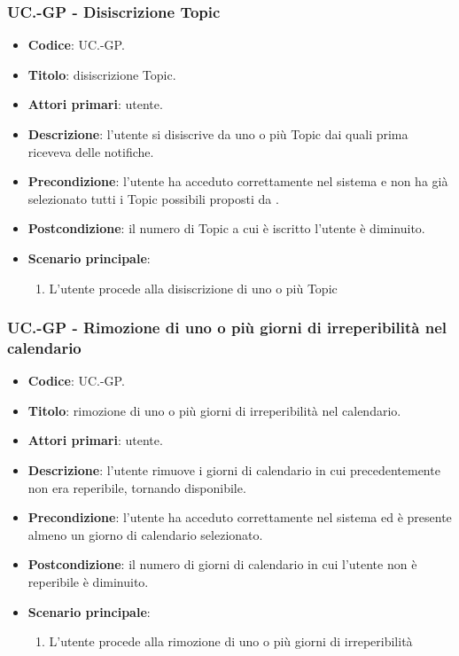 	\subsubsection{UC\theuccount.\thesubuccount-GP - Disiscrizione Topic}

		\begin{itemize}
			\item \textbf{Codice}: UC\theuccount.\thesubuccount-GP.
			\item \textbf{Titolo}: disiscrizione Topic.
			\item \textbf{Attori primari}: utente.
			\item \textbf{Descrizione}: l’utente si disiscrive da uno o più Topic dai quali prima riceveva delle notifiche.
			\item \textbf{Precondizione}: l’utente ha acceduto correttamente nel sistema e non ha già selezionato tutti i Topic possibili proposti da \progetto.
			\item \textbf{Postcondizione}: il numero di Topic a cui è iscritto l’utente è diminuito.
			\item \textbf{Scenario principale}:
			\begin{enumerate}
				\item L'utente procede alla disiscrizione di uno o più Topic
			\end{enumerate}
		\end{itemize}

	\subsubsection{UC\theuccount.\thesubuccount-GP - Rimozione di uno o più giorni di irreperibilità nel calendario}

	\begin{itemize}
		\item \textbf{Codice}: UC\theuccount.\thesubuccount-GP.
		\item \textbf{Titolo}: rimozione di uno o più giorni di irreperibilità nel calendario.
		\item \textbf{Attori primari}: utente.
		\item \textbf{Descrizione}: l’utente rimuove i giorni di calendario in cui precedentemente	non era reperibile, tornando disponibile.
		\item \textbf{Precondizione}: l’utente ha acceduto correttamente nel sistema ed è presente almeno un giorno di calendario selezionato.
		\item \textbf{Postcondizione}: il numero di giorni di calendario in cui l’utente non è reperibile è diminuito.
		\item \textbf{Scenario principale}:
		\begin{enumerate}
			\item L'utente procede alla rimozione di uno o più giorni di irreperibilità
		\end{enumerate}
	\end{itemize}

